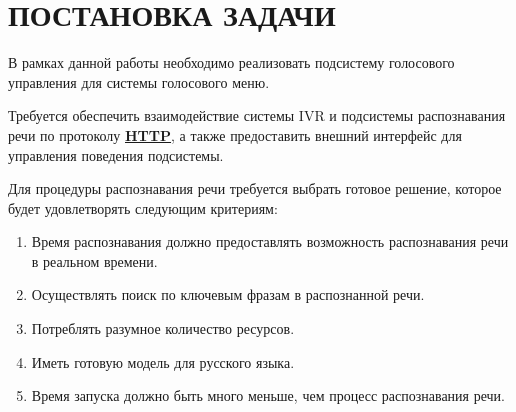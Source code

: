 \chapter{ПОСТАНОВКА ЗАДАЧИ}

В рамках данной работы необходимо реализовать подсистему голосового управления
для системы голосового меню.

Требуется обеспечить взаимодействие системы IVR и подсистемы распознавания речи
по протоколу \hyperlink{http}{\textbf{HTTP}}, а также предоставить внешний
интерфейс для управления поведения подсистемы.

Для процедуры распознавания речи требуется выбрать готовое решение, которое будет
удовлетворять следующим критериям:
\begin{enumerate} \label{enum:asr:cond}
    \item Время распознавания должно предоставлять возможность распознавания речи
        в реальном времени.
    \item Осуществлять поиск по ключевым фразам в распознанной речи.
    \item Потреблять разумное количество ресурсов.
    \item Иметь готовую модель для русского языка.
    \item Время запуска должно быть много меньше, чем процесс распознавания речи.
\end{enumerate}
